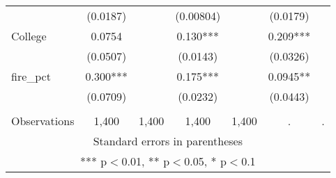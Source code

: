 \begin{tabular}{lcccccc}
 & (0.0187) &  & (0.00804) &  & (0.0179) &  \\
College & 0.0754 &  & 0.130*** &  & 0.209*** &  \\
 & (0.0507) &  & (0.0143) &  & (0.0326) &  \\
fire\_pct & 0.300*** &  & 0.175*** &  & 0.0945** &  \\
 & (0.0709) &  & (0.0232) &  & (0.0443) &  \\
 &  &  &  &  &  &  \\
 Observations & 1,400 & 1,400 & 1,400 & 1,400 & . & . \\ \hline
\multicolumn{7}{c}{ Standard errors in parentheses} \\
\multicolumn{7}{c}{ *** p$<$0.01, ** p$<$0.05, * p$<$0.1} \\
\end{tabular}
